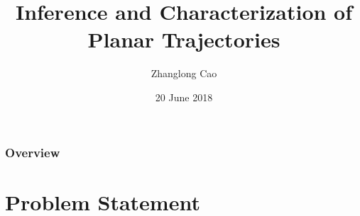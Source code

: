\documentclass{beamer}
\title[]{Inference and Characterization of Planar Trajectories} %
\author{Zhanglong Cao} %
\institute[UO] %
{
Department of Maths \& Stats  \\
University of Otago %
}
\date{20 June 2018} %
\begin{document}
\begin{frame}
\titlepage %
\end{frame}

\begin{frame}
\frametitle{Overview} %
\tableofcontents %
\end{frame}


\section{Problem Statement} 
\end{document}
